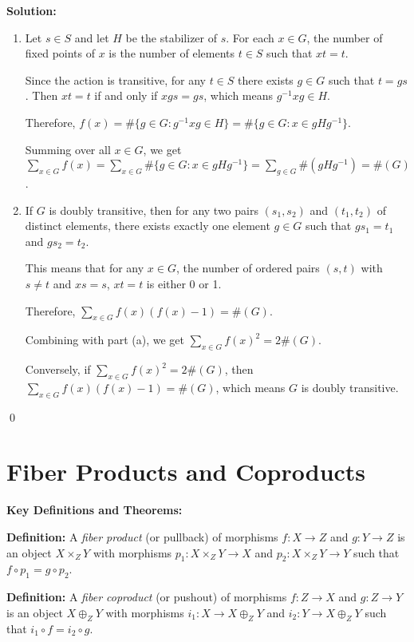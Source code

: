 \noindent\textbf{Solution:}
\begin{enumerate}[label=(\alph*)]
\item Let $s \in S$ and let $H$ be the stabilizer of $s$. For each $x \in G$, the number of fixed points of $x$ is the number of elements $t \in S$ such that $xt = t$.

Since the action is transitive, for any $t \in S$ there exists $g \in G$ such that $t = gs$. Then $xt = t$ if and only if $xgs = gs$, which means $g^{-1}xg \in H$.

Therefore, $f(x) = \#\{g \in G : g^{-1}xg \in H\} = \#\{g \in G : x \in gHg^{-1}\}$.

Summing over all $x \in G$, we get $\sum_{x \in G} f(x) = \sum_{x \in G} \#\{g \in G : x \in gHg^{-1}\} = \sum_{g \in G} \#(gHg^{-1}) = \#(G)$.

\item If $G$ is doubly transitive, then for any two pairs $(s_1, s_2)$ and $(t_1, t_2)$ of distinct elements, there exists exactly one element $g \in G$ such that $gs_1 = t_1$ and $gs_2 = t_2$.

This means that for any $x \in G$, the number of ordered pairs $(s, t)$ with $s \neq t$ and $xs = s$, $xt = t$ is either 0 or 1.

Therefore, $\sum_{x \in G} f(x)(f(x)-1) = \#(G)$.

Combining with part (a), we get $\sum_{x \in G} f(x)^2 = 2\#(G)$.

Conversely, if $\sum_{x \in G} f(x)^2 = 2\#(G)$, then $\sum_{x \in G} f(x)(f(x)-1) = \#(G)$, which means $G$ is doubly transitive.
\end{enumerate}


\qed
\section{Fiber Products and Coproducts}

\textbf{Key Definitions and Theorems:}

\textbf{Definition:} A \textit{fiber product} (or pullback) of morphisms $f: X \to Z$ and $g: Y \to Z$ is an object $X \times_Z Y$ with morphisms $p_1: X \times_Z Y \to X$ and $p_2: X \times_Z Y \to Y$ such that $f \circ p_1 = g \circ p_2$.

\textbf{Definition:} A \textit{fiber coproduct} (or pushout) of morphisms $f: Z \to X$ and $g: Z \to Y$ is an object $X \oplus_Z Y$ with morphisms $i_1: X \to X \oplus_Z Y$ and $i_2: Y \to X \oplus_Z Y$ such that $i_1 \circ f = i_2 \circ g$.

